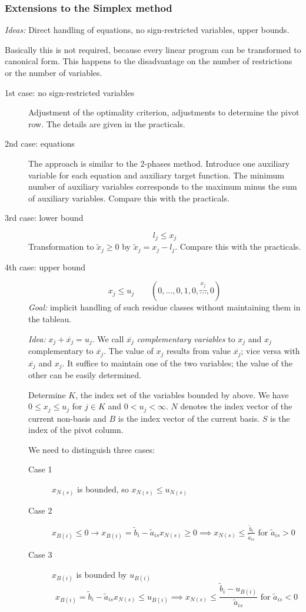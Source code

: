 \documentclass[a4paper]{article}
\numberwithin{lecref}{subsection}
\begin{document}
\subsubsection{Extensions to the Simplex method}

\emph{Ideas:} Direct handling of equations, no sign-restricted variables, upper bounds.

Basically this is not required, because every linear program can be transformed to canonical form.
This happens to the disadvantage on the number of restrictions or the number of variables. 

\begin{description}
	\item[1st case: no sign-restricted variables] 
		Adjustment of the optimality criterion, adjustments to determine the pivot row.
		The details are given in the practicals.
	\item[2nd case: equations]
		The approach is similar to the 2-phases method. Introduce one auxiliary variable for each equation and auxiliary target function.
		The minimum number of auxiliary variables corresponds to the maximum minus the sum of auxiliary variables.
		Compare this with the practicals.
	\item[3rd case: lower bound]
		\[ l_j \leq x_j \]
		Transformation to $\tilde x_j \geq 0$ by $\tilde x_j = x_j - l_j$. Compare this with the practicals.
	\item[4th case: upper bound]
		\[ x_j \leq u_j \qquad (0, \dots, 0, 1, 0, \overbrace{\dots}^{x_j}, 0) \]
		\emph{Goal:} implicit handling of such residue classes without maintaining them in the tableau.

		\emph{Idea:} $x_j + \overline{x_j} = u_j$.
		We call $\overline{x_j}$ \emph{complementary variables} to $x_j$ and $x_j$ complementary to $\overline{x_j}$.
		The value of $x_j$ results from value $\overline{x_j}$; vice versa with $\overline{x_j}$ and $x_j$.
		It suffice to maintain one of the two variables; the value of the other can be easily determined.
 
		Determine $K$, the index set of the variables bounded by above. We have $0 \leq x_j \leq u_j$ for $j \in K$ and $0 < u_j < \infty$.
		$N$ denotes the index vector of the current non-basis and $B$ is the index vector of the current basis.
		$S$ is the index of the pivot column.

		We need to distinguish three cases:
		\begin{description}
			\item[Case 1] $x_{N(s)}$ is bounded, so $x_{N(s)} \leq u_{N(s)}$
			\item[Case 2] $x_{B(i)} \leq 0 \to x_{B(i)} = \tilde b_i - \tilde a_{is} x_{N(s)} \geq 0 \implies x_{N(s)} \leq \frac{\tilde b_i}{\tilde a_{is}}$ for $\tilde a_{is} > 0$
			\item[Case 3] $x_{B(i)}$ is bounded by $u_{B(i)}$
				\[ x_{B(i)} = \tilde b_i - \tilde a_{is} x_{N(s)} \leq u_{B(i)} \implies x_{N(s)} \leq \frac{\tilde b_i - u_{B(i)}}{\tilde a_{is}} \text{ for } \tilde a_{is} < 0 \]
		\end{description}


\end{description}
\end{document}
